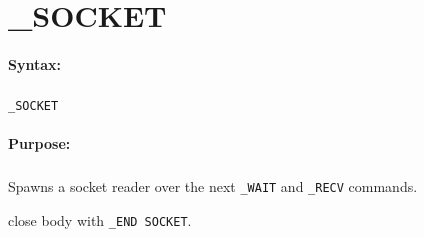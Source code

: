 
\newpage
\section{\_SOCKET}
\label{cmd:_SOCKET}

\paragraph{Syntax:}
\subparagraph{}
\texttt{\_SOCKET}

\paragraph{Purpose:}
\subparagraph{}
Spawns a socket reader over the next \texttt{\_WAIT} and \texttt{\_RECV} commands.

close body with \texttt{\_END SOCKET}.